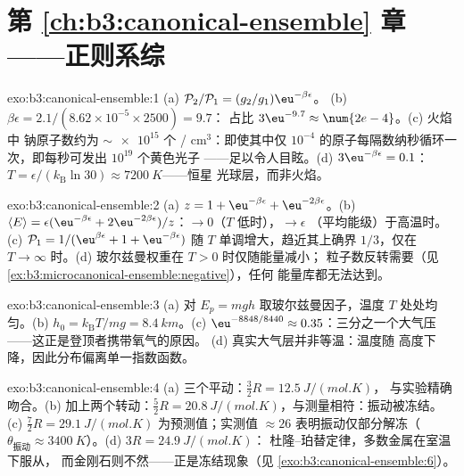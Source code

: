 \section*{第 \ref{ch:b3:canonical-ensemble} 章——正则系综}

\begin{solution}{exo:b3:canonical-ensemble:1}
(a) $\mathcal P_2/\mathcal P_1 = (g_2/g_1)\eu^{-\beta\epsilon}$。
(b) $\beta\epsilon = 2.1/(8.62\times10^{-5} \times 2500) = 9.7$：
占比 $3\eu^{-9.7} \approx \num{2e-4}$。(c) 火焰中
钠原子数约为 $\sim\num{e15}$ 个 / cm$^3$：即使其中仅 $10^{-4}$
的原子每隔数纳秒循环一次，即每秒可发出 $10^{19}$ 个黄色光子
——足以令人目眩。(d) $3\eu^{-\beta\epsilon} = 0.1$：
$T = \epsilon/(k_{\text{B}}\ln30) \approx \qty{7200}{K}$——恒星
光球层，而非火焰。
\end{solution}

\begin{solution}{exo:b3:canonical-ensemble:2}
(a) $z = 1 + \eu^{-\beta\epsilon} + \eu^{-2\beta\epsilon}$。(b)
$\langle E\rangle = \epsilon(\eu^{-\beta\epsilon} +
2\eu^{-2\beta\epsilon})/z$：$\to 0$（$T$ 低时），$\to \epsilon$
（平均能级）于高温时。(c) $\mathcal P_1 = 1/(\eu^{\beta
\epsilon} + 1 + \eu^{-\beta\epsilon})$ 随
$T$ 单调增大，趋近其上确界 $1/3$，仅在 $T \to \infty$ 时。(d)
玻尔兹曼权重在 $T > 0$ 时仅随能量减小；
粒子数反转需要（见
\cref{ex:b3:microcanonical-ensemble:negative}），任何
能量库都无法达到。
\end{solution}

\begin{solution}{exo:b3:canonical-ensemble:3}
(a) 对 $E_p = mgh$ 取玻尔兹曼因子，温度 $T$ 处处均匀。(b) $h_0 =
k_{\text{B}}T/mg = \qty{8.4}{km}$。(c) $\eu^{-8848/8440} \approx
0.35$：三分之一个大气压——这正是登顶者携带氧气的原因。
(d) 真实大气层并非等温：温度随
高度下降，因此分布偏离单一指数函数。
\end{solution}

\begin{solution}{exo:b3:canonical-ensemble:4}
(a) 三个平动：$\tfrac32 R = \qty{12.5}{J/(mol.K)}$，
与实验精确吻合。(b) 加上两个转动：$\tfrac52 R =
\qty{20.8}{J/(mol.K)}$，与测量相符：振动被冻结。(c)
$\tfrac72 R = \qty{29.1}{J/(mol.K)}$ 为预测值；实测值
$\approx26$ 表明振动仅部分解冻（$\theta_{\text{振动}}
\approx \qty{3400}{K}$）。(d) $3R = \qty{24.9}{J/(mol.K)}$：
杜隆–珀替定律，多数金属在室温下服从，
而金刚石则不然——正是冻结现象（见
\cref{exo:b3:canonical-ensemble:6}）。
\end{solution}


